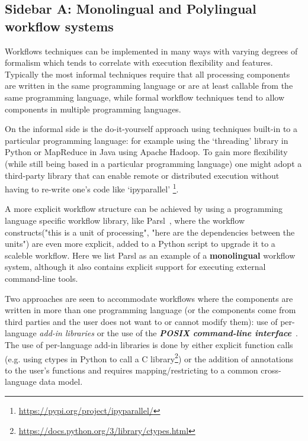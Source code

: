 \documentclass[sigconf,authordraft]{acmart}
\begin{document}
\subsection{Sidebar A: Monolingual and Polylingual workflow systems}

Workflows techniques can be implemented in many ways with varying degrees of formalism which tends to correlate with execution flexibility and features. Typically the most informal techniques require that all processing components are written in the same programming language or are at least callable from the same programming language, while formal workflow techniques tend to allow components in multiple programming languages. 

On the informal side is the do-it-yourself approach using techniques built-in to a particular programming language: for example using the `threading' library in Python or MapReduce in Java using Apache Hadoop\cite{taylor_overview_2010}. To gain more flexibility (while still being based in a particular programming language) one might adopt a third-party library that can enable remote or distributed execution without having to re-write one's code like `ipyparallel' \footnote{\url{https://pypi.org/project/ipyparallel/}}.

A more explicit workflow structure can be achieved by using a programming language specific workflow library, like Parsl~\cite{babuji_parsl_2019}, where the workflow constructs("this is a unit of processing", "here are the dependencies between the units") are even more explicit, added to a Python script to upgrade it to a scaleble workflow. Here we list Parsl as an example of a \textbf{monolingual} workflow system, although it also contains explicit support for executing external command-line tools.

Two approaches are seen to accommodate workflows where the components are written in more than one programming language (or the components come from third parties and the user does not want to or cannot modify them): use of per-language \textit{add-in libraries} or the use of the \textbf{\textit{POSIX command-line interface}}~\cite{the_austin_group_posix1-2008_2008}. The use of per-language add-in libraries is done by either explicit function calls (e.g. using ctypes in Python to call a C library\footnote{\url{https://docs.python.org/3/library/ctypes.html}}) or the addition of annotations to the user's functions and requires mapping/restricting to a common cross-language data model.
\end{document}
